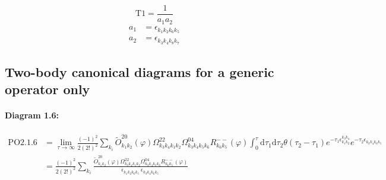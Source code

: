 \documentclass[10pt,a4paper]{article}
\begin{document}
\begin{equation}
\text{T}1 = \frac{1}{a_1a_2}\end{equation}
\begin{align*}
a_1 &= \epsilon^{}_{k_{1}k_{2}k_{6}k_{5}}\\
a_2 &= \epsilon^{}_{k_{3}k_{4}k_{8}k_{7}}
\end{align*}
\subsection{Two-body canonical diagrams for a generic operator only}

\paragraph{Diagram 1.6:}
\begin{align}
\text{PO}2.1.6
&= \lim\limits_{\tau \to \infty}\frac{(-1)^2 }{2(2!)^2}\sum_{k_i}\tilde{O}^{20}_{k_{1}k_{2}} (\varphi) \Omega^{22}_{k_{3}k_{4}k_{1}k_{2}} \Omega^{04}_{k_{3}k_{4}k_{5}k_{6}} R^{--}_{k_{6}k_{5}}(\varphi)\int_{0}^{\tau}\mathrm{d}\tau_1\mathrm{d}\tau_2\theta(\tau_2-\tau_1) e^{-\tau_1 \epsilon^{k_{3}k_{4}}_{k_{1}k_{2}}}e^{-\tau_2 \epsilon^{}_{k_{3}k_{4}k_{6}k_{5}}}
 \nonumber \\
&= \frac{(-1)^2 }{2(2!)^2}\sum_{k_i}\frac{\tilde{O}^{20}_{k_{1}k_{2}} (\varphi) \Omega^{22}_{k_{3}k_{4}k_{1}k_{2}} \Omega^{04}_{k_{3}k_{4}k_{5}k_{6}} R^{--}_{k_{6}k_{5}}(\varphi)}{\epsilon^{}_{k_{1}k_{2}k_{6}k_{5}}\ \epsilon^{}_{k_{3}k_{4}k_{6}k_{5}}\ } 
\end{align}
\end{document}
